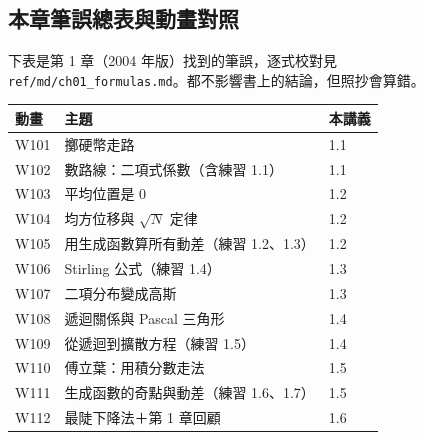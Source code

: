 \subsection{本章筆誤總表與動畫對照}

下表是第 1 章（2004 年版）找到的筆誤，逐式校對見 \texttt{ref/md/ch01\_formulas.md}。都不影響書上的結論，但照抄會算錯。

\begin{table}[H]
\centering
\small
\renewcommand{\arraystretch}{1.25}
\TabErrata
\caption{第 1 章筆誤一覽。}
\end{table}

\begin{center}
\small
\begin{tabular}{@{}lll@{}}
\toprule
動畫 & 主題 & 本講義\\
\midrule
W101 & 擲硬幣走路 & 1.1\\
W102 & 數路線：二項式係數（含練習 1.1） & 1.1\\
W103 & 平均位置是 0 & 1.2\\
W104 & 均方位移與 $\sqrt N$ 定律 & 1.2\\
W105 & 用生成函數算所有動差（練習 1.2、1.3） & 1.2\\
W106 & Stirling 公式（練習 1.4） & 1.3\\
W107 & 二項分布變成高斯 & 1.3\\
W108 & 遞迴關係與 Pascal 三角形 & 1.4\\
W109 & 從遞迴到擴散方程（練習 1.5） & 1.4\\
W110 & 傅立葉：用積分數走法 & 1.5\\
W111 & 生成函數的奇點與動差（練習 1.6、1.7） & 1.5\\
W112 & 最陡下降法＋第 1 章回顧 & 1.6\\
\bottomrule
\end{tabular}
\end{center}
